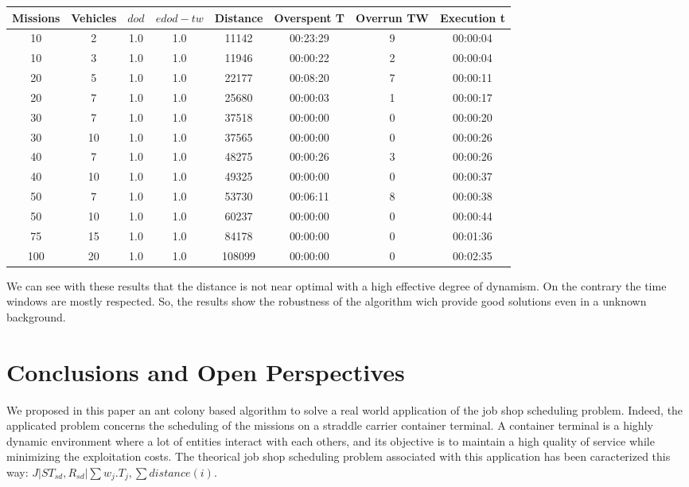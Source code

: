 \documentclass[a4paper,10pt]{article}
\begin{document}
  \small
  \begin{center}
    \begin{tabular}{|c|c|c|c|c|c|c|c|} 
    \hline
    \bf{Missions} & \bf{Vehicles} & \bf{$dod$} & \bf{$edod-tw$} & \bf{Distance} & \bf{Overspent T} & \bf{Overrun TW} &  \bf{Execution t} \\ \hline
    10	 & 2 	& 1.0	& 1.0	& 11142	& 00:23:29	& 9	& 00:00:04\\
    10	 & 3 	& 1.0	& 1.0	& 11946	& 00:00:22	& 2	& 00:00:04\\
    20	 & 5 	& 1.0	& 1.0	& 22177	& 00:08:20	& 7	& 00:00:11\\
    20	 & 7 	& 1.0	& 1.0	& 25680	& 00:00:03	& 1	& 00:00:17\\
    30	 & 7 	& 1.0	& 1.0	& 37518	& 00:00:00	& 0	& 00:00:20\\
    30	 & 10 	& 1.0	& 1.0	& 37565	& 00:00:00	& 0	& 00:00:26\\
    40	 & 7 	& 1.0	& 1.0	& 48275	& 00:00:26	& 3	& 00:00:26\\
    40	 & 10 	& 1.0	& 1.0	& 49325	& 00:00:00	& 0	& 00:00:37\\
    50	 & 7 	& 1.0	& 1.0	& 53730	& 00:06:11	& 8	& 00:00:38\\
    50	 & 10 	& 1.0	& 1.0	& 60237	& 00:00:00	& 0	& 00:00:44\\
    75	 & 15 	& 1.0	& 1.0	& 84178	& 00:00:00	& 0	& 00:01:36\\
    100	 & 20 	& 1.0	& 1.0	& 108099& 00:00:00	& 0	& 00:02:35\\
    \hline
    \end{tabular}
  \end{center}
  \normalsize

We can see with these results that the distance is not near optimal with a high effective degree of dynamism. On the contrary the time windows are mostly respected. So, the results show the robustness of the algorithm wich provide good solutions even in a unknown background.



\section{Conclusions and Open Perspectives}

We proposed in this paper an ant colony based algorithm to solve a real world application of the job shop scheduling problem. Indeed, the applicated problem concerns the scheduling of the missions on a straddle carrier container terminal. A container terminal is a highly dynamic environment where a lot of entities interact with each others, and its objective is to maintain a high quality of service while minimizing the exploitation costs. The theorical job shop scheduling problem associated with this application has been caracterized this way: ${ J|ST_{sd}, R_{sd}|\sum w_j.T_{j} , \sum distance(i)}$.\\
\end{document}
